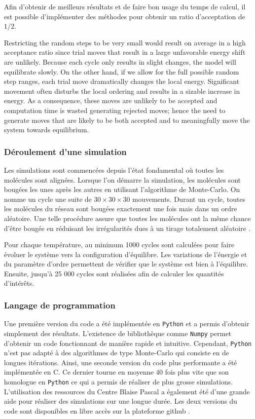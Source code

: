 \documentclass[11pt,a4paper]{article}
\numberwithin{equation}{section}
\newcommand{\CC}{C\nolinebreak\hspace{-.05em}\raisebox{.4ex}{\tiny\bf +}\nolinebreak\hspace{-.10em}\raisebox{.4ex}{\tiny\bf +}}
\def\CC{{C\nolinebreak[4]\hspace{-.05em}\raisebox{.4ex}{\tiny\bf ++}}}
\begin{document}
Afin d'obtenir de meilleurs résultats et de faire bon usage du temps de calcul, il est possible d'implémenter des méthodes pour obtenir un ratio d'acceptation de $1/2$. 

Restricting the random steps to be very small would result on average in a high acceptance ratio since
trial moves that result in a large unfavorable energy shift are unlikely. Because each cycle only results in
slight changes, the model will equilibrate slowly. On the other hand, if we allow for the full possible
random step ranges, each trial move dramatically changes the local energy. Significant movement often
disturbs the local ordering and results in a sizable increase in energy. As a consequence, these moves
are unlikely to be accepted and computation time is wasted generating rejected moves; hence the need
to generate moves that are likely to be both accepted and to meaningfully move the system towards
equilibrium.


\subsubsection{Déroulement d'une simulation} 
Les simulations sont commencées depuis l'état fondamental où toutes les molécules sont alignées. Lorsque l'on démarre la simulation, les molécules sont bougées les unes après les autres en utilisant l'algorithme de Monte-Carlo. On nomme un cycle une suite de $30\times 30\times 30$ mouvements. Durant un cycle, toutes les molécules du réseau sont bougées exactement une fois mais dans un ordre aléatoire. Une telle procédure assure que toutes les molécules ont la même chance d'être bougée en réduisant les irrégularités dues à un tirage totalement aléatoire \cite{fabbri}. 
\medskip

Pour chaque température, au minimum 1000 cycles sont calculées pour faire évoluer le système vers la configuration d'équilibre. Les variations de l'énergie et du paramètre d'ordre permettent de vérifier que le système est bien à l'équilibre. Ensuite, jusqu'à 25 000 cycles sont réalisées afin de calculer les quantités d'intérêts.

\subsubsection{Langage de programmation}
Une première version du code a été implémentée en \texttt{Python} et a permis d'obtenir simplement des résultats. L'existence de bibliothèque comme \texttt{Numpy} permet d'obtenir un code fonctionnant de manière rapide et intuitive. Cependant, \texttt{Python} n'est pas adapté à des algorithmes de type Monte-Carlo qui consiste en de longues itérations. Ainsi, une seconde version du code plus performante a été implémentée en \CC. Ce dernier tourne en moyenne 40 fois plus vite que son homologue en \texttt{Python} ce qui a permis de réaliser de plus grosse simulations. L'utilisation des ressources du Centre Blaise Pascal a également été d'une grande aide pour réaliser des simulations sur une longue durée. Les deux versions du code sont disponibles en libre accès sur la plateforme github \cite{github}.
\newpage
\end{document}
